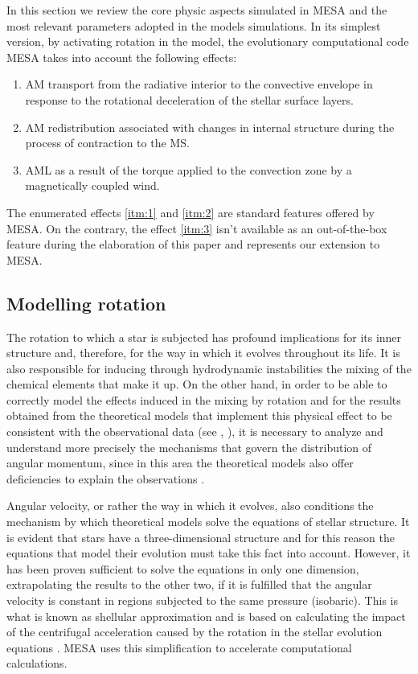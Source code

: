 \documentclass[fleqn,usenatbib]{mnras}
\begin{document}
In this section we review the core physic aspects simulated in MESA and the most relevant parameters adopted in the models simulations. In its simplest version, by activating rotation in the model, the evolutionary computational code MESA takes into account the following effects:
\begin{enumerate}
    \item AM transport from the radiative interior to the convective envelope in response to the rotational deceleration of the stellar surface layers\label{itm:1}.
    \item AM redistribution associated with changes in internal structure during the process of contraction to the MS\label{itm:2}.
    \item AML as a result of the torque applied to the convection zone by a magnetically coupled wind\label{itm:3}.
\end{enumerate}

The enumerated effects \ref{itm:1} and \ref{itm:2} are standard features offered by MESA. On the contrary, the effect \ref{itm:3} isn't available as an out-of-the-box feature during the elaboration of this paper and represents our extension to MESA.

\subsection{Modelling rotation}
The rotation to which a star is subjected has profound implications for its inner structure and, therefore, for the way in which it evolves throughout its life. It is also responsible for inducing through hydrodynamic instabilities the mixing of the chemical elements that make it up. On the other hand, in order to be able to correctly model the effects induced in the mixing by rotation and for the results obtained from the theoretical models that implement this physical effect to be consistent with the observational data (see \citet{Pinsonneault1997}, \citet{Maeder2000}), it is necessary to analyze and understand more precisely the mechanisms that govern the distribution of angular momentum, since in this area the theoretical models also offer deficiencies to explain the observations \citep{Denissenkov2007}. \par

Angular velocity, or rather the way in which it evolves, also conditions the mechanism by which theoretical models solve the equations of stellar structure. It is evident that stars have a three-dimensional structure and for this reason the equations that model their evolution must take this fact into account. However, it has been proven sufficient to solve the equations in only one dimension, extrapolating the results to the other two, if it is fulfilled that the angular velocity is constant in regions subjected to the same pressure (isobaric). This is what is known as shellular approximation \citet{Meynet1997} and is based on calculating the impact of the centrifugal acceleration caused by the rotation in the stellar evolution equations \citep{Endal1976}. MESA uses this simplification to accelerate computational calculations.\par
\end{document}

